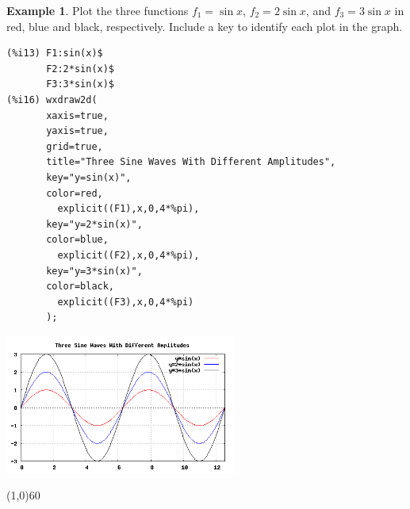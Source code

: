 \documentclass[10.5pt,twoside]{report}
\theoremstyle{definition}
\newtheorem{exmp}{Example}[section]
\begin{document}
\begin{exmp}
Plot the three functions $f_1=\sin{x}$, $f_2=2\sin{x}$, and $f_3=3\sin{x}$ in red, blue and black, respectively.  Include a key to identify each plot in the graph.\\


\begin{verbatim}
(%i13) F1:sin(x)$
       F2:2*sin(x)$
       F3:3*sin(x)$
(%i16) wxdraw2d(
       xaxis=true,
       yaxis=true,
       grid=true,
       title="Three Sine Waves With Different Amplitudes",
       key="y=sin(x)",
       color=red,
         explicit((F1),x,0,4*%pi),
       key="y=2*sin(x)",
       color=blue,
         explicit((F2),x,0,4*%pi),
       key="y=3*sin(x)",
       color=black,
         explicit((F3),x,0,4*%pi)
       );
\end{verbatim}


\includegraphics[width=3in]{example_1_2_4}





\end{exmp}

\line(1,0){60}
\linethickness{0.5mm}
\end{document}
